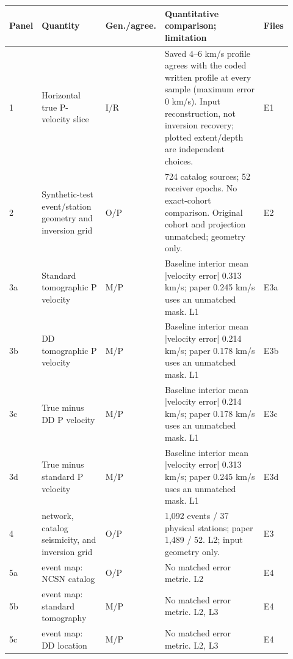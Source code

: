\begin{longtable}{@{}p{0.115\linewidth}p{0.245\linewidth}p{0.06\linewidth}p{0.445\linewidth}p{0.055\linewidth}@{}}\toprule Panel & Quantity & Gen./\newline agree. & Quantitative comparison; limitation & Files\\\midrule\endhead

1 & Horizontal true P-velocity slice & I/R & Saved 4--6 km/s profile agrees with the coded written profile at every sample (maximum error 0 km/s). Input reconstruction, not inversion recovery; plotted extent/depth are independent choices. & E1\\[3pt]

2 & Synthetic-test event/station geometry and inversion grid & O/P & 724 catalog sources; 52 receiver epochs. No exact-cohort comparison. Original cohort and projection unmatched; geometry only. & E2\\[3pt]

3a & Standard tomographic P velocity & M/P & Baseline interior mean |velocity error| 0.313 km/s; paper 0.245 km/s uses an unmatched mask. L1 & E3a\\[3pt]

3b & DD tomographic P velocity & M/P & Baseline interior mean |velocity error| 0.214 km/s; paper 0.178 km/s uses an unmatched mask. L1 & E3b\\[3pt]

3c & True minus DD P velocity & M/P & Baseline interior mean |velocity error| 0.214 km/s; paper 0.178 km/s uses an unmatched mask. L1 & E3c\\[3pt]

3d & True minus standard P velocity & M/P & Baseline interior mean |velocity error| 0.313 km/s; paper 0.245 km/s uses an unmatched mask. L1 & E3d\\[3pt]

4 & network, catalog seismicity, and inversion grid & O/P & 1,092 events / 37 physical stations; paper 1,489 / 52. L2; input geometry only. & E3\\[3pt]

5a & event map: NCSN catalog & O/P & No matched error metric. L2 & E4\\[3pt]

5b & event map: standard tomography & M/P & No matched error metric. L2, L3 & E4\\[3pt]

5c & event map: DD location & M/P & No matched error metric. L2, L3 & E4\\[3pt]


\end{longtable}
